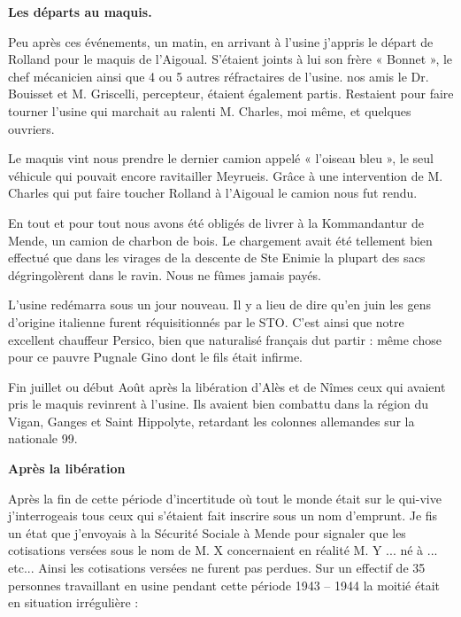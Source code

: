 \vspace{0.55cm}

\textbf{Les départs au maquis.}

\vspace{0.35cm}

Peu après ces événements, un matin, en arrivant à l’usine j’appris le départ de Rolland pour le
maquis de l’Aigoual. S’étaient joints à lui son frère « Bonnet », le chef mécanicien ainsi que
4 ou 5 autres réfractaires de l’usine. nos amis le Dr. Bouisset et M. Griscelli, percepteur,
étaient également partis. Restaient pour faire tourner l’usine qui marchait au ralenti M.
Charles, moi même, et quelques ouvriers.

\vspace{0.45cm}

Le maquis vint nous prendre le dernier camion appelé « l’oiseau bleu », le seul véhicule qui
pouvait encore ravitailler Meyrueis. Grâce à une intervention de M. Charles qui put faire
toucher Rolland à l’Aigoual le camion nous fut rendu.

\vspace{0.45cm}

En tout et pour tout nous avons été obligés de livrer à la Kommandantur de Mende, un camion
de charbon de bois. Le chargement avait été tellement bien effectué que dans les virages de la descente de Ste Enimie la plupart des sacs dégringolèrent dans le ravin. Nous ne fûmes jamais
payés.

L’usine redémarra sous un jour nouveau. Il y a lieu de dire qu’en juin les gens d’origine
italienne furent réquisitionnés par le STO. C’est ainsi que notre excellent chauffeur Persico,
bien que naturalisé français dut partir : même chose pour ce pauvre Pugnale Gino dont le fils
était infirme.

\vspace{0.45cm}

Fin juillet ou début Août après la libération d’Alès et de Nîmes ceux qui avaient pris le
maquis revinrent à l’usine. Ils avaient bien combattu dans la région du Vigan, Ganges et Saint
Hippolyte, retardant les colonnes allemandes sur la nationale 99.

\vspace{0.55cm}

\textbf{Après la libération}

\vspace{0.35cm}

Après la fin de cette période d’incertitude où tout le monde était sur le qui-vive j’interrogeais
tous ceux qui s’étaient fait inscrire sous un nom d’emprunt. Je fis un état que j’envoyais à la
Sécurité Sociale à Mende pour signaler que les cotisations versées sous le nom de M. X
concernaient en réalité M. Y ... né à ... etc... Ainsi les cotisations versées ne furent pas
perdues. Sur un effectif de 35 personnes travaillant en usine pendant cette période 1943 –
1944 la moitié était en situation irrégulière :

